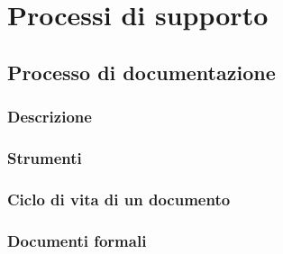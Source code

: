 \section{Processi di supporto}

\subsection{Processo di documentazione}
\subsubsection{Descrizione}

\subsubsection{Strumenti}

\subsubsection{Ciclo di vita di un documento}

\subsubsection{Documenti formali}

\paragraph{\SdF}

\paragraph{\NdP}

\paragraph{\PdP}

\paragraph{\PdQ}

\paragraph{\AdR}

\paragraph{\ST}

